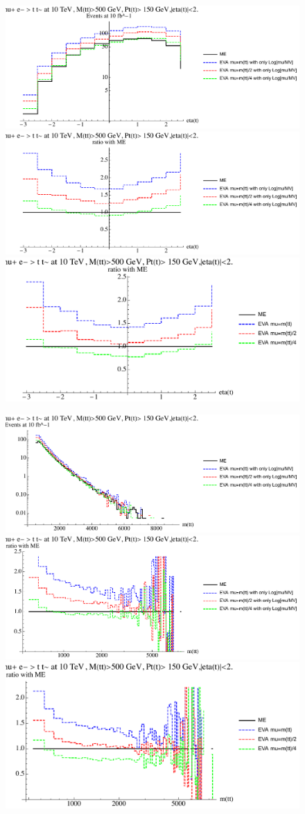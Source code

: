 \documentclass[a4paper,11pt]{article}
\begin{document}
\begin{figure}[ht]
\includegraphics[width=0.4\linewidth]{PlotDistr/WW_tt/10TeVcuts/plotetat.pdf}
\includegraphics[width=0.4\linewidth]{PlotDistr/WW_tt/10TeVcuts/plotetatratio1.pdf}
\includegraphics[width=0.4\linewidth]{PlotDistr/WW_tt/10TeVcuts/plotetatratio2.pdf}
\end{figure}

\begin{figure}[ht]
\includegraphics[width=0.4\linewidth]{PlotDistr/WW_tt/10TeVcuts/plotmtt.pdf}
\includegraphics[width=0.4\linewidth]{PlotDistr/WW_tt/10TeVcuts/plotmttratio1.pdf}
\includegraphics[width=0.4\linewidth]{PlotDistr/WW_tt/10TeVcuts/plotmttratio2.pdf}
\end{figure}
\end{document}
